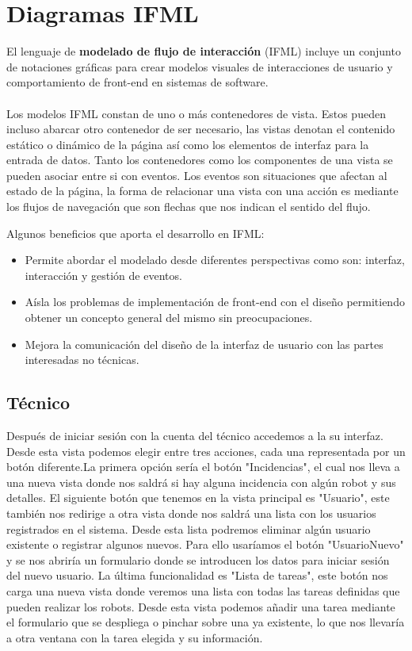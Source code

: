 \documentclass{scrreprt}
\begin{document}
\section{Diagramas IFML}

El lenguaje de \textbf{modelado de flujo de interacción} (IFML) incluye un conjunto de notaciones gráficas para crear modelos visuales de interacciones de usuario y comportamiento de front-end en sistemas de software. \\
\\
Los modelos IFML constan de uno o más contenedores de vista. Estos pueden incluso abarcar otro contenedor de ser necesario, las vistas denotan el contenido estático o dinámico de la página así como los elementos de interfaz para la entrada de datos. Tanto los contenedores como los componentes de una vista se pueden asociar entre si con eventos. Los eventos son situaciones que afectan al estado de la página, la forma de relacionar una vista con una acción es mediante los flujos de navegación que son flechas que nos indican el sentido del flujo.

Algunos beneficios que aporta el desarrollo en IFML:

\begin{itemize}
    \item Permite abordar el modelado desde diferentes perspectivas como son: interfaz, interacción y gestión de eventos.
    \item Aísla los problemas de implementación de front-end con el diseño permitiendo obtener un concepto general del mismo sin preocupaciones.
    \item Mejora la comunicación del diseño de la interfaz de usuario con las partes interesadas no técnicas.
\end{itemize}

\subsection{Técnico} 

Después de iniciar sesión con la cuenta del técnico accedemos a la su interfaz. Desde esta vista podemos elegir entre tres acciones, cada una representada por un botón diferente.La primera opción sería el botón "Incidencias", el cual nos lleva a una nueva vista donde nos saldrá si hay alguna incidencia con algún robot y sus detalles. El siguiente botón que tenemos en la vista principal es "Usuario", este también nos redirige a otra vista donde nos saldrá una lista con los usuarios registrados en el sistema. Desde esta lista podremos eliminar algún usuario existente o registrar algunos nuevos. Para ello usaríamos el botón "UsuarioNuevo" y se nos abriría un formulario donde se introducen los datos para iniciar sesión del nuevo usuario.
La última funcionalidad es "Lista de tareas", este botón nos carga una nueva vista donde veremos una lista con todas las tareas definidas que pueden realizar los robots. Desde esta vista podemos añadir una tarea mediante el formulario que se despliega o pinchar sobre una ya existente, lo que nos llevaría a otra ventana con la tarea elegida y su información.
\end{document}

